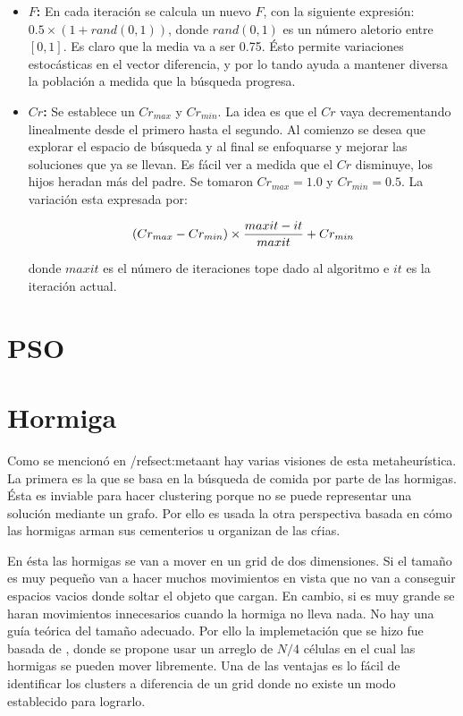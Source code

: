\begin{itemize}

\item {\bf $F$:} En cada iteraci\'on se calcula un nuevo $F$, con la siguiente expresi\'on:
$0.5 \times (1 + rand(0,1))$, donde $rand(0,1)$ es un n\'umero aletorio entre $[0,1]$.
Es claro que la media va a ser 0.75. \'Esto permite variaciones estoc\'asticas en el vector diferencia, y
por lo tando ayuda a mantener diversa la poblaci\'on a medida que la b\'usqueda progresa.

\item {\bf $Cr$:} Se establece un $Cr_{max}$ y $Cr_{min}$. La idea es que el $Cr$ vaya
decrementando linealmente desde el primero hasta el segundo. Al comienzo
se desea que explorar el espacio de b\'usqueda y al final se enfoquarse y mejorar las soluciones
que ya se llevan. Es f\'acil ver a medida que el $Cr$ disminuye, los hijos heradan m\'as
del padre. Se tomaron $Cr_{max} = 1.0$ y $Cr_{min} = 0.5$. La variaci\'on esta expresada por:

\[
(Cr_{max}-Cr_{min}) \times {{maxit - it} \over maxit} + Cr_{min}
\]

donde $maxit$ es el n\'umero de iteraciones tope dado al algoritmo e $it$ es la iteraci\'on actual.

\end{itemize}

\section{PSO}  \label{chap:ipso}

\section{Hormiga}  \label{chap:ihormiga}

Como se mencion\'o en /ref{sect:metaant} hay varias visiones de esta metaheur\'istica.
La primera es la que se basa en la b\'usqueda de comida por parte de las hormigas.
\'Esta es inviable para hacer clustering porque no se puede representar 
una soluci\'on mediante un grafo. Por ello es usada la otra perspectiva basada en c\'omo
las hormigas arman sus cementerios u organizan de las c\'rias. 

En \'esta las hormigas se van a mover en un grid de dos dimensiones. Si 
el tama\~no es muy peque\~no van a hacer muchos movimientos en vista que
no van a conseguir espacios vacios donde soltar el objeto que cargan. En cambio,
si es muy grande se haran movimientos innecesarios cuando la hormiga no lleva nada.
No hay una gu\'ia te\'orica del tama\~no adecuado. Por ello la implemetaci\'on que
se hizo fue basada de \cite{OuBa2007}, donde se propone usar un arreglo 
de $N/4$ c\'elulas en el cual las hormigas se pueden mover libremente.
Una de las ventajas es lo f\'acil de identificar los clusters a diferencia
de un grid donde no existe un modo establecido para lograrlo.

